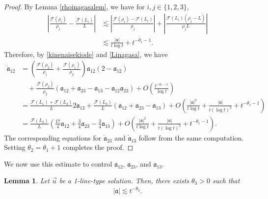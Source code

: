 \documentclass[reqno]{amsart}
\theoremstyle{plain}
\newtheorem{lemma}[theorem]{Lemma}
\theoremstyle{definition}
\numberwithin{equation}{section}
\begin{document}
\begin{proof}
By Lemma \ref{rhoinagasalem}, we have for $i,j\in\{1,2,3\}$,
\begin{align*}
\left|\frac{\mathcal{F}(\rho_i)}{\rho_j}-\frac{\mathcal{F}(L_i)}{L}\right|&\lesssim \left|\frac{\mathcal{F}(\rho_i)-\mathcal{F}(L_i)}{\rho_j}\right|+\left|\frac{\mathcal{F}(L_i)(\rho_j-L)}{\rho_jL}\right|
\\
&\lesssim \frac{|\mathfrak{a}|}{t\log{t}}+t^{-\theta_1-1}.
\end{align*}
Therefore, by \eqref{kinenaisekiode} and \eqref{Linagasa}, we have
\begin{align*}
\dot{\mathfrak{a}}_{12}&=\left(\frac{\mathcal{F}(\rho_2)}{\rho_1}+\frac{\mathcal{F}(\rho_1)}{\rho_2}\right)\mathfrak{a}_{12}\left(2-\mathfrak{a}_{12}\right)
\\
&\quad+\frac{\mathcal{F}(\rho_3)}{\rho_2}\left(\mathfrak{a}_{12}+\mathfrak{a}_{23}-\mathfrak{a}_{13}-\mathfrak{a}_{12}\mathfrak{a}_{23}\right)+O\left(\frac{t^{-\theta_1-1}}{\log{t}}\right)
\\
&=\frac{\mathcal{F}(L_1)+\mathcal{F}(L_2)}{L}2\mathfrak{a}_{12}+\frac{\mathcal{F}(L_3)}{L}\left(\mathfrak{a}_{12}+\mathfrak{a}_{23}-\mathfrak{a}_{13}\right)+O\left(\frac{|\mathfrak{a}|^2}{t\log{t}}+\frac{|\mathfrak{a}|}{t(\log{t})^2}+t^{-\theta_1-1}\right)
\\
&=\frac{\mathcal{F}(L_2)}{L}\left(\frac{17}{4}\mathfrak{a}_{12}+\frac{3}{4}\mathfrak{a}_{23}-\frac{3}{4}\mathfrak{a}_{13}\right)+O\left(\frac{|\mathfrak{a}|^2}{t\log{t}}+\frac{|\mathfrak{a}|}{t(\log{t})^2}+t^{-\theta_1-1}\right).
\end{align*}
The corresponding equations for $\dot{\mathfrak{a}}_{23}$ and $\dot{\mathfrak{a}}_{13}$ follow from the same computation. Setting $\theta_2=\theta_1+1$ completes the proof.
\end{proof}

We now use this estimate to control $\mathfrak{a}_{12}$, $\mathfrak{a}_{23}$, and $\mathfrak{a}_{13}$.
\begin{lemma}\label{naisekiosaerusharp}
Let $\vec{u}$ be a 1-line-type solution. Then, there exists $\theta_3>0$ such that 
\begin{align}\label{,athfrakasharpes}
|\mathfrak{a}|\lesssim t^{-\theta_3}.
\end{align} 
\end{lemma}
\end{document}
